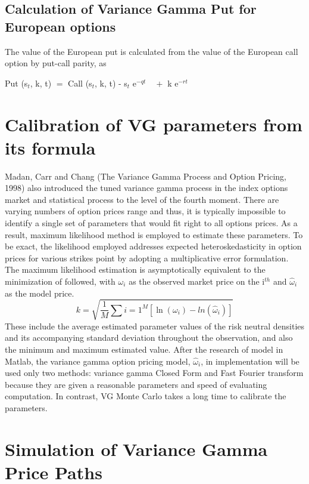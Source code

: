 \subsection{Calculation of Variance Gamma Put for European options}

The value of the European put is calculated from the value of the European 
call option by put-call parity, as

\begin{center}
Put (s$_{t}$, k, t) $=$ Call (s$_{t}$, k, t) - s$_{t}$ e$^{-qt} \quad +$ k 
e$^{-rt}$
\end{center}

\section{Calibration of VG parameters from its formula}

Madan, Carr and Chang (The Variance Gamma Process and Option Pricing, 1998) 
also introduced the tuned variance gamma process in the index options market 
and statistical process to the level of the fourth moment. There are varying 
numbers of option prices range and thus, it is typically impossible to 
identify a single set of parameters that would fit right to all options 
prices. As a result, maximum likelihood method is employed to estimate these 
parameters. To be exact, the likelihood employed addresses expected 
heteroskedasticity in option prices for various strikes point by adopting a 
multiplicative error formulation. The maximum likelihood estimation is 
asymptotically equivalent to the minimization of followed, with $\omega_{i}$ as 
the observed market price on the i$^{th}$ and $\hat{\omega}_{i}$ as the 
model price.
\[
k=\sqrt{\frac{1}{M}\sum{i=1}^M[\ln(\omega_i)-ln(\hat{\omega}_{i})]}
\]
These include the average estimated parameter values of the risk neutral 
densities and its accompanying standard deviation throughout the 
observation, and also the minimum and maximum estimated value. After the 
research of model in Matlab, the variance gamma option pricing model, $\hat{\omega}_{i}$, in implementation will be used only two methods: variance 
gamma Closed Form and Fast Fourier transform because they are given a 
reasonable parameters and speed of evaluating computation. In contrast, VG 
Monte Carlo takes a long time to calibrate the parameters.

\section{Simulation of Variance Gamma Price Paths}

